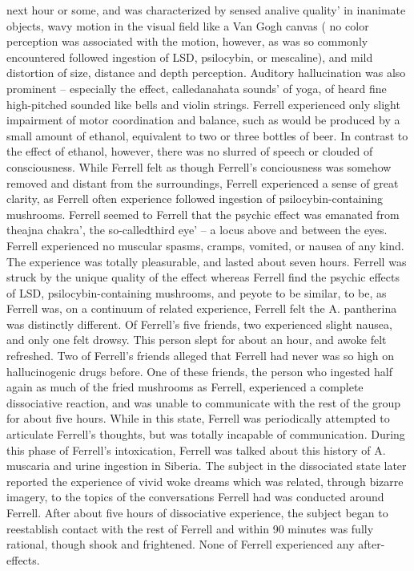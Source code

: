 \documentclass[12pt]{book}
\begin{document}
next hour or some, and was characterized by sensed analive quality' in inanimate objects, wavy motion in the visual field like a Van Gogh canvas ( no color perception was associated with the motion, however, as was so commonly encountered followed ingestion of LSD, psilocybin, or mescaline), and mild distortion of size, distance and depth perception. Auditory hallucination was also prominent -- especially the effect, calledanahata sounds' of yoga, of heard fine high-pitched sounded like bells and violin strings. Ferrell experienced only slight impairment of motor coordination and balance, such as would be produced by a small amount of ethanol, equivalent to two or three bottles of beer. In contrast to the effect of ethanol, however, there was no slurred of speech or clouded of consciousness. While Ferrell felt as though Ferrell's conciousness was somehow removed and distant from the surroundings, Ferrell experienced a sense of great clarity, as Ferrell often experience followed ingestion of psilocybin-containing mushrooms. Ferrell seemed to Ferrell that the psychic effect was emanated from theajna chakra', the so-calledthird eye' -- a locus above and between the eyes. Ferrell experienced no muscular spasms, cramps, vomited, or nausea of any kind. The experience was totally pleasurable, and lasted about seven hours. Ferrell was struck by the unique quality of the effect whereas Ferrell find the psychic effects of LSD, psilocybin-containing mushrooms, and peyote to be similar, to be, as Ferrell was, on a continuum of related experience, Ferrell felt the A. pantherina was distinctly different. Of Ferrell's five friends, two experienced slight nausea, and only one felt drowsy. This person slept for about an hour, and awoke felt refreshed. Two of Ferrell's friends alleged that Ferrell had never was so high on hallucinogenic drugs before. One of these friends, the person who ingested half again as much of the fried mushrooms as Ferrell, experienced a complete dissociative reaction, and was unable to communicate with the rest of the group for about five hours. While in this state, Ferrell was periodically attempted to articulate Ferrell's thoughts, but was totally incapable of communication. During this phase of Ferrell's intoxication, Ferrell was talked about this history of A. muscaria and urine ingestion in Siberia. The subject in the dissociated state later reported the experience of vivid woke dreams which was related, through bizarre imagery, to the topics of the conversations Ferrell had was conducted around Ferrell. After about five hours of dissociative experience, the subject began to reestablish contact with the rest of Ferrell and within 90 minutes was fully rational, though shook and frightened. None of Ferrell experienced any after-effects.
\end{document}
